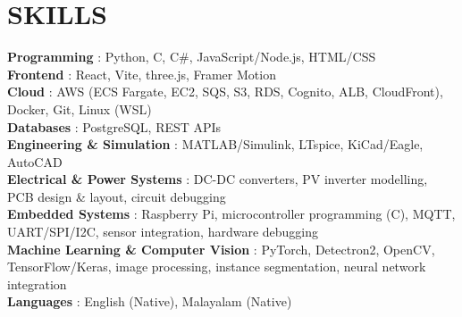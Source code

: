 \documentclass[letterpaper,11pt]{article}
\begin{document}
\section{SKILLS}
 \begin{itemize}[leftmargin=0in, label={}]
    \small{\item{
    \textbf{Programming} {: Python, C, C\#, JavaScript/Node.js, HTML/CSS} \vspace{2pt} \\
    \textbf{Frontend} {: React, Vite, three.js, Framer Motion} \vspace{2pt} \\
    \textbf{Cloud} {: AWS (ECS Fargate, EC2, SQS, S3, RDS, Cognito, ALB, CloudFront), Docker, Git, Linux (WSL)} \vspace{2pt} \\
    \textbf{Databases} {: PostgreSQL, REST APIs} \vspace{2pt} \\
    \textbf{Engineering \& Simulation} {: MATLAB/Simulink, LTspice, KiCad/Eagle, AutoCAD} \vspace{2pt} \\
    \textbf{Electrical \& Power Systems} {: DC-DC converters, PV inverter modelling, PCB design \& layout, circuit debugging} \vspace{2pt} \\
    \textbf{Embedded Systems} {: Raspberry Pi, microcontroller programming (C), MQTT, UART/SPI/I2C, sensor integration, hardware debugging} \vspace{2pt} \\
    \textbf{Machine Learning \& Computer Vision} {: PyTorch, Detectron2, OpenCV, TensorFlow/Keras, image processing, instance segmentation, neural network integration} \vspace{2pt} \\
    \textbf{Languages} {: English (Native), Malayalam (Native)}
    }}
 \end{itemize}

\end{document}
